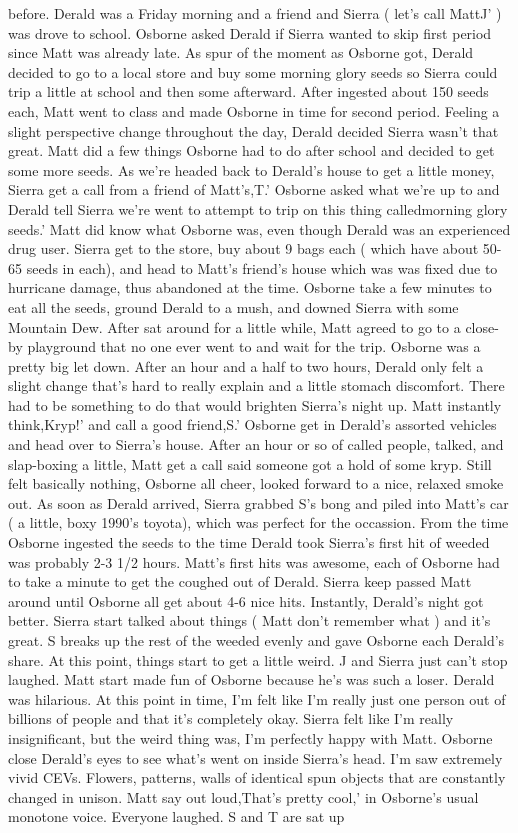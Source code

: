 \documentclass[12pt]{book}
\begin{document}
before. Derald was a Friday morning and a friend and Sierra ( let's call MattJ' ) was drove to school. Osborne asked Derald if Sierra wanted to skip first period since Matt was already late. As spur of the moment as Osborne got, Derald decided to go to a local store and buy some morning glory seeds so Sierra could trip a little at school and then some afterward. After ingested about 150 seeds each, Matt went to class and made Osborne in time for second period. Feeling a slight perspective change throughout the day, Derald decided Sierra wasn't that great. Matt did a few things Osborne had to do after school and decided to get some more seeds. As we're headed back to Derald's house to get a little money, Sierra get a call from a friend of Matt's,T.' Osborne asked what we're up to and Derald tell Sierra we're went to attempt to trip on this thing calledmorning glory seeds.' Matt did know what Osborne was, even though Derald was an experienced drug user. Sierra get to the store, buy about 9 bags each ( which have about 50-65 seeds in each), and head to Matt's friend's house which was was fixed due to hurricane damage, thus abandoned at the time. Osborne take a few minutes to eat all the seeds, ground Derald to a mush, and downed Sierra with some Mountain Dew. After sat around for a little while, Matt agreed to go to a close-by playground that no one ever went to and wait for the trip. Osborne was a pretty big let down. After an hour and a half to two hours, Derald only felt a slight change that's hard to really explain and a little stomach discomfort. There had to be something to do that would brighten Sierra's night up. Matt instantly think,Kryp!' and call a good friend,S.' Osborne get in Derald's assorted vehicles and head over to Sierra's house. After an hour or so of called people, talked, and slap-boxing a little, Matt get a call said someone got a hold of some kryp. Still felt basically nothing, Osborne all cheer, looked forward to a nice, relaxed smoke out. As soon as Derald arrived, Sierra grabbed S's bong and piled into Matt's car ( a little, boxy 1990's toyota), which was perfect for the occassion. From the time Osborne ingested the seeds to the time Derald took Sierra's first hit of weeded was probably 2-3 1/2 hours. Matt's first hits was awesome, each of Osborne had to take a minute to get the coughed out of Derald. Sierra keep passed Matt around until Osborne all get about 4-6 nice hits. Instantly, Derald's night got better. Sierra start talked about things ( Matt don't remember what ) and it's great. S breaks up the rest of the weeded evenly and gave Osborne each Derald's share. At this point, things start to get a little weird. J and Sierra just can't stop laughed. Matt start made fun of Osborne because he's was such a loser. Derald was hilarious. At this point in time, I'm felt like I'm really just one person out of billions of people and that it's completely okay. Sierra felt like I'm really insignificant, but the weird thing was, I'm perfectly happy with Matt. Osborne close Derald's eyes to see what's went on inside Sierra's head. I'm saw extremely vivid CEVs. Flowers, patterns, walls of identical spun objects that are constantly changed in unison. Matt say out loud,That's pretty cool,' in Osborne's usual monotone voice. Everyone laughed. S and T are sat up 
\end{document}
